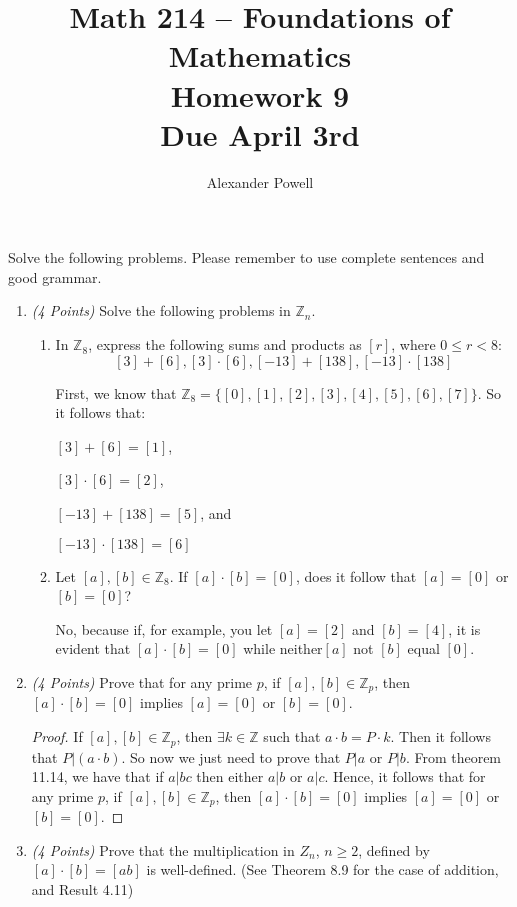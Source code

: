 \documentclass[10pt]{article} %
\title{Math 214 -- Foundations of Mathematics\\
Homework 9\\
{\large{\bf Due April 3rd}}}
\date{}
\author{Alexander Powell}
\newcommand{\Z}{\mathbb{Z}}
\newcommand{\points}[1]{{\it (#1 Points)}}
\def\blue#1{\textcolor{blue}{#1}}
\begin{document}
\maketitle

Solve the following problems.  Please remember to use complete sentences
and good grammar.


\begin{enumerate}

\item  \points{4} Solve the following problems in $\Z_n$.
\begin{enumerate}
\item In $\Z_8$, express the following sums and products as $[r]$, where $0\le r<8$:
 $$[3]+[6],   [3]\cdot [6],  [-13]+[138], [-13]\cdot[138]$$
  
  First, we know that $\Z_8=\{[0],[1],[2],[3],[4],[5],[6],[7]\}$.  So it follows that: 
 
 $[3]+[6]=[1]$,
 
 $[3]\cdot [6]=[2]$,
 
 $[-13]+[138]=[5]$, and 
 
 $[-13]\cdot[138]=[6]$
 
\item Let $[a], [b]\in \Z_8$. If $[a]\cdot [b]=[0]$, does it follow that $[a]=[0]$ or $[b]=[0]$?

 No, because if, for example, you let $[a]=[2]$ and $[b]=[4]$, it is evident that $[a]\cdot [b]=[0]$ while neither$[a]$ not $[b]$ equal $[0]$.  
\end{enumerate}

\item \points{4} Prove that for any prime $p$,  if $[a], [b]\in \Z_p$, then
$[a]\cdot [b]=[0]$ implies $[a]=[0]$ or $[b]=[0]$.

\begin{proof} If $[a], [b]\in \Z_p$, then $\exists k \in \Z$ such that $a \cdot b=P \cdot k$.  Then it follows that $P|(a \cdot b)$.  So now we just need to prove that $P|a$ or $P|b$.  From theorem 11.14, we have that if $a|bc$ then either $a|b$ or $a|c$.  Hence, it follows that for any prime $p$,  if $[a], [b]\in \Z_p$, then
$[a]\cdot [b]=[0]$ implies $[a]=[0]$ or $[b]=[0]$.  
\end{proof}

\item \points{4} Prove that the multiplication in $Z_n$, $n\ge 2$, defined by $[a]\cdot [b]=[ab]$ is well-defined. (See Theorem 8.9 for the case of addition, and Result 4.11)


\end{enumerate}
\end{document}
